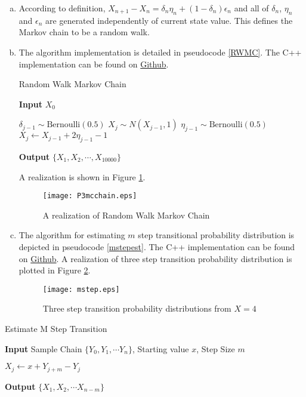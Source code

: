 \documentclass[12pt]{article}
\begin{document}
\begin{enumerate}[(a)]
	\item According to definition, $X_{n+1} - X_{n} = \delta_n \eta_n + (1-\delta_n) \epsilon_n$ and all of $\delta_n$, $\eta_n$ and $\epsilon_n$ are generated independently of current state value. This defines the Markov chain to be a random walk.
	
	\item The algorithm implementation is detailed in pseudocode \ref{RWMC}. The C++ implementation can be found on \href{https://github.com/mkbwang/BIOSTAT882/blob/master/HW1/P3.cpp}{Github}.
	\begin{algorithm}
		\caption{Random Walk Markov Chain}\label{RWMC}
		\hspace*{\algorithmicindent} \textbf{Input} $X_0$
		\begin{algorithmic}[1]
			\State $\delta_{j-1} \sim \text{Bernoulli}(0.5)$
			\State $X_j \sim N(X_{j-1}, 1)$
			\Else
			\State $\eta_{j-1} \sim \text{Bernoulli}(0.5)$
			\State $X_j \gets X_{j-1} + 2\eta_{j-1} - 1$
			\EndIf
			\EndFor
		\end{algorithmic}
		\hspace*{\algorithmicindent} \textbf{Output} $\{X_1 , X_2 ,\cdots ,X_{10000} \}$
	\end{algorithm}

	A realization is shown in Figure \ref{rwmcchain}.
	\begin{figure}[htbp]
		\centering
		\texttt{[image: P3mcchain.eps]}
		\caption{A realization of Random Walk Markov Chain}\label{rwmcchain}
	\end{figure}
	\item 
	
	The algorithm for estimating $m$ step transitional probability distribution is depicted in pseudocode \ref{mstepest}. The C++ implementation can be found on \href{https://github.com/mkbwang/BIOSTAT882/blob/master/HW1/P3.cpp}{Github}. A realization of three step transition probability distribution is plotted in Figure \ref{mstepplot}.
	\begin{figure}[htbp]
		\centering
		\texttt{[image: mstep.eps]}
		\caption{Three step transition probability distributions from $X=4$}\label{mstepplot}
	\end{figure}
\end{enumerate}



\begin{algorithm}
	\caption{Estimate M Step Transition}\label{mstepest}
	\hspace*{\algorithmicindent} \textbf{Input} Sample Chain $\{Y_0, Y_1, \cdots Y_n \}$, Starting value $x$, Step Size $m$
	\begin{algorithmic}[1]
		\For{$j \gets 0$ to $n-m$}
		\State $X_j \gets x + Y_{j+m} - Y_{j}$
		\EndFor
	\end{algorithmic}
	\hspace*{\algorithmicindent} \textbf{Output} $\{ X_1,X_2, \cdots X_{n-m} \}$
\end{algorithm}
\end{document}
